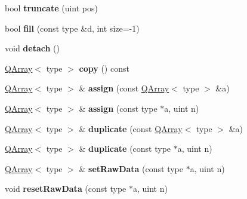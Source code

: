 \begin{DoxyCompactItemize}
bool {\bfseries truncate} (uint pos)
\item 
\mbox{\label{class_q_array_ac659207d09bbd90d9a31c91ff425490e}} 
bool {\bfseries fill} (const type \&d, int size=-\/1)
\item 
\mbox{\label{class_q_array_aed81a36728344a4d944ca2639d21a162}} 
void {\bfseries detach} ()
\item 
\mbox{\label{class_q_array_a7278f284d7ff989470176f9dc1ee263e}} 
\mbox{\hyperlink{class_q_array}{Q\+Array}}$<$ type $>$ {\bfseries copy} () const
\item 
\mbox{\label{class_q_array_a4bfb1e75aa87a691f9bcbdb894022f95}} 
\mbox{\hyperlink{class_q_array}{Q\+Array}}$<$ type $>$ \& {\bfseries assign} (const \mbox{\hyperlink{class_q_array}{Q\+Array}}$<$ type $>$ \&a)
\item 
\mbox{\label{class_q_array_a3f38816b5bb61a5846a563900b4f3611}} 
\mbox{\hyperlink{class_q_array}{Q\+Array}}$<$ type $>$ \& {\bfseries assign} (const type $\ast$a, uint n)
\item 
\mbox{\label{class_q_array_a17cb2acfeb58ffb962f5048ee79bcd07}} 
\mbox{\hyperlink{class_q_array}{Q\+Array}}$<$ type $>$ \& {\bfseries duplicate} (const \mbox{\hyperlink{class_q_array}{Q\+Array}}$<$ type $>$ \&a)
\item 
\mbox{\label{class_q_array_a65234c6c937135bb67f96fb2c6ff6553}} 
\mbox{\hyperlink{class_q_array}{Q\+Array}}$<$ type $>$ \& {\bfseries duplicate} (const type $\ast$a, uint n)
\item 
\mbox{\label{class_q_array_a5d29d910696e670349a33854710f4d1f}} 
\mbox{\hyperlink{class_q_array}{Q\+Array}}$<$ type $>$ \& {\bfseries set\+Raw\+Data} (const type $\ast$a, uint n)
\item 
\mbox{\label{class_q_array_a7bdf2011fa958db2fe21c50e202125c3}} 
void {\bfseries reset\+Raw\+Data} (const type $\ast$a, uint n)
\item 
\mbox{\label{class_q_array_aac5cb5ca44c48721fd92957ef06df595}} 

\end{DoxyCompactItemize}
